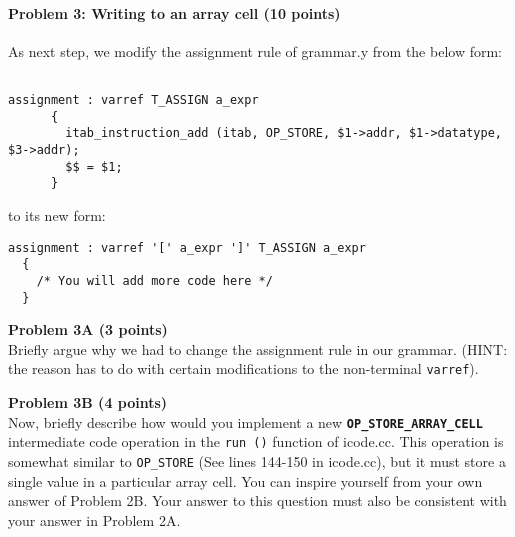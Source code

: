 

\paragraph{Problem 3: Writing to an array cell (10 points)}

As next step, we modify the assignment rule of grammar.y from the below form:

\vspace{2em}

\begin{lstlisting}

assignment : varref T_ASSIGN a_expr 
      {
        itab_instruction_add (itab, OP_STORE, $1->addr, $1->datatype, $3->addr);
        $$ = $1;
      }

\end{lstlisting}

\vspace{1em}

to its new form:

\vspace{1em}

\begin{lstlisting}
assignment : varref '[' a_expr ']' T_ASSIGN a_expr 
  {
    /* You will add more code here */ 
  }
\end{lstlisting}

\vspace{2em}

{\bf Problem 3A (3 points)}
\\
Briefly argue why we had to change the assignment rule in our grammar.
(HINT: the reason has to do with certain modifications to the non-terminal \texttt{varref}).

\begin{tcolorbox}[height=4in]

\end{tcolorbox}


\pagebreak
{\bf Problem 3B (4 points)}
\\
Now, briefly describe how would you implement a new 
{\bf \texttt{OP\_STORE\_ARRAY\_CELL}} intermediate code operation 
in the \texttt{run ()} function of icode.cc.
This operation is somewhat similar to \texttt{OP\_STORE} (See lines 144-150 in icode.cc), 
but it must store 
a single value in a particular array cell.
You can inspire yourself from your own answer of Problem 2B. Your
answer to this question must also be consistent with your answer in Problem 2A.

\begin{tcolorbox}[height=6in]

\end{tcolorbox}

